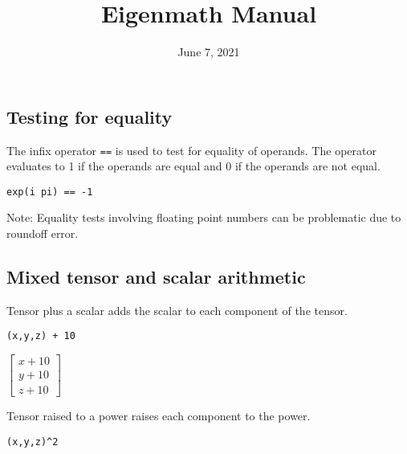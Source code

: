 \documentclass[12pt]{article}
\title{Eigenmath Manual}
\date{June 7, 2021}
\author{}
\begin{document}
\maketitle

\tableofcontents

\newpage





\subsection{Testing for equality}
The infix operator \verb$==$ is used to test for equality of operands.
The operator evaluates to 1 if the operands are equal and 0 if the operands are not equal.

\begin{Verbatim}[formatcom=\color{blue}]
exp(i pi) == -1
\end{Verbatim}


\bigskip
\noindent
Note: Equality tests involving floating point numbers
can be problematic due to roundoff error.















\subsection{Mixed tensor and scalar arithmetic}

\noindent
Tensor plus a scalar adds the scalar to each component of the tensor.

{\color{blue}\begin{verbatim}
(x,y,z) + 10
\end{verbatim}}

\noindent
$\begin{bmatrix}x+10\\y+10\\z+10\end{bmatrix}$

\bigskip
\noindent
Tensor raised to a power raises each component to the power.

{\color{blue}\begin{verbatim}
(x,y,z)^2
\end{verbatim}}
\end{document}
